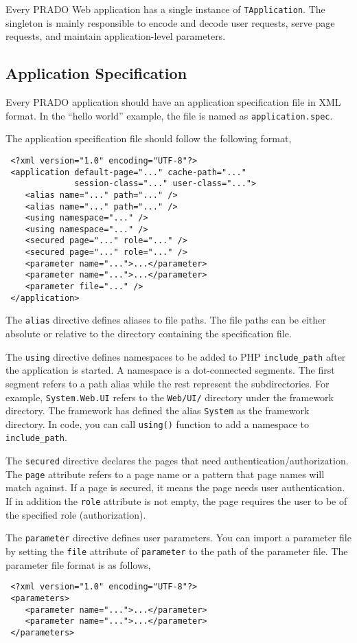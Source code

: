 \documentclass{book}
\begin{document}
Every PRADO Web application has a single instance of
\verb|TApplication|. The singleton is mainly responsible to encode
and decode user requests, serve page requests, and maintain
application-level parameters.


\subsection{Application Specification}

Every PRADO application should have an application specification
file in XML format. In the ``hello world'' example, the file is
named as \verb|application.spec|.


The application specification file should follow the following
format,
\begin{verbatim}
 <?xml version="1.0" encoding="UTF-8"?>
 <application default-page="..." cache-path="..."
              session-class="..." user-class="...">
    <alias name="..." path="..." />
    <alias name="..." path="..." />
    <using namespace="..." />
    <using namespace="..." />
    <secured page="..." role="..." />
    <secured page="..." role="..." />
    <parameter name="...">...</parameter>
    <parameter name="...">...</parameter>
    <parameter file="..." />
 </application>
\end{verbatim}

The \verb|alias| directive defines aliases to file paths. The file
paths can be either absolute or relative to the directory
containing the specification file.

The \verb|using| directive defines namespaces to be added to PHP
\verb|include_path| after the application is started. A namespace
is a dot-connected segments. The first segment refers to a path
alias while the rest represent the subdirectories. For example,
\verb|System.Web.UI| refers to the \verb|Web/UI/| directory under
the framework directory. The framework has defined the alias
\verb|System| as the framework directory. In code, you can call
\verb|using()| function to add a namespace to \verb|include_path|.

The \verb|secured| directive declares the pages that need
authentication/authorization. The \verb|page| attribute refers to
a page name or a pattern that page names will match against. If a
page is secured, it means the page needs user authentication. If
in addition the \verb|role| attribute is not empty, the page
requires the user to be of the specified role (authorization).

The \verb|parameter| directive defines user parameters. You can
import a parameter file by setting the \verb|file| attribute of
\verb|parameter| to the path of the parameter file. The parameter
file format is as follows,
\begin{verbatim}
 <?xml version="1.0" encoding="UTF-8"?>
 <parameters>
    <parameter name="...">...</parameter>
    <parameter name="...">...</parameter>
 </parameters>
\end{verbatim}
\end{document}
